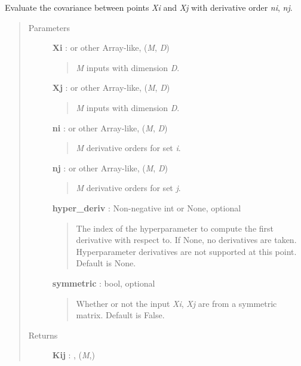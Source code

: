 \documentclass[letterpaper,10pt,english]{sphinxmanual}
\begin{document}
\begin{fulllineitems}
\begin{fulllineitems}
\label{gptools.kernel:gptools.kernel.matern.MaternKernel1d.__call__}
Evaluate the covariance between points \emph{Xi} and \emph{Xj} with derivative order \emph{ni}, \emph{nj}.
\begin{quote}\begin{description}
\item[{Parameters}] \leavevmode
\textbf{Xi} :  or other Array-like, (\emph{M}, \emph{D})
\begin{quote}

\emph{M} inputs with dimension \emph{D}.
\end{quote}

\textbf{Xj} :  or other Array-like, (\emph{M}, \emph{D})
\begin{quote}

\emph{M} inputs with dimension \emph{D}.
\end{quote}

\textbf{ni} :  or other Array-like, (\emph{M}, \emph{D})
\begin{quote}

\emph{M} derivative orders for set \emph{i}.
\end{quote}

\textbf{nj} :  or other Array-like, (\emph{M}, \emph{D})
\begin{quote}

\emph{M} derivative orders for set \emph{j}.
\end{quote}

\textbf{hyper\_deriv} : Non-negative int or None, optional
\begin{quote}

The index of the hyperparameter to compute the first derivative
with respect to. If None, no derivatives are taken. Hyperparameter
derivatives are not supported at this point. Default is None.
\end{quote}

\textbf{symmetric} : bool, optional
\begin{quote}

Whether or not the input \emph{Xi}, \emph{Xj} are from a symmetric matrix.
Default is False.
\end{quote}

\item[{Returns}] \leavevmode
\textbf{Kij} : , (\emph{M},)
\begin{quote}


\end{quote}
\end{description}
\end{quote}
\end{fulllineitems}
\end{fulllineitems}
\end{document}
